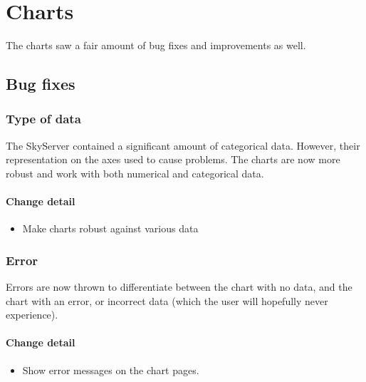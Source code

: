 \section{Charts}
The charts saw a fair amount of bug fixes and improvements as well.


\subsection{Bug fixes}
  \subsubsection{Type of data}
  The SkyServer contained a significant amount of categorical data. However, their representation on the axes
  used to cause problems. The charts are now more robust and work with both numerical and categorical data.
  
 \paragraph{Change detail}
\begin{itemize}
  \item Make charts robust against various data
\end{itemize}
  
 \subsubsection{Error}
  Errors are now thrown to differentiate between the chart with no data, and the chart with an error,
  or incorrect data (which the user will hopefully never experience). 
  
   \paragraph{Change detail}
\begin{itemize}
  \item Show error messages on the chart pages.
\end{itemize}
  
